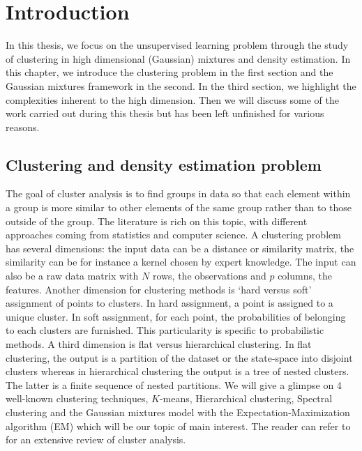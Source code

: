 
\chapter{Introduction\label{chap:intro}}
\minitoc
In this thesis, we focus on the unsupervised learning problem through the study of clustering in high dimensional (Gaussian) mixtures and density estimation. In this chapter, we introduce the clustering problem in the first section and the Gaussian mixtures framework in the second. In the third section, we highlight the complexities inherent to the high dimension. Then we will discuss some of the work carried out during this thesis but has been left unfinished for various reasons.
\section{Clustering and density estimation problem}
The goal of cluster analysis is to find groups in data so that each element within a group is more similar to other elements of the same group rather than to those outside of the group. The literature is rich on this topic, with different approaches coming from statistics and computer science. A clustering problem has several dimensions: the input data can be a distance or similarity matrix, the similarity can be for instance a kernel chosen by expert knowledge. The input can also be a raw data matrix with $N$ rows, the observations and $p$ columns, the features. Another dimension for clustering methods is `hard versus soft' assignment of points to clusters. In hard assignment, a point is assigned to  a unique cluster. In soft assignment, for each point, the probabilities of belonging to each clusters are furnished. This particularity is specific to probabilistic methods. A third dimension is flat versus hierarchical clustering. In flat clustering, the output is a partition of the dataset or the state-space into disjoint clusters whereas in hierarchical clustering the output is a tree of nested clusters. The latter is a finite sequence of nested partitions. We will give a glimpse on 4 well-known clustering techniques, $K$-means, Hierarchical clustering, Spectral clustering and the Gaussian mixtures model with the Expectation-Maximization algorithm (EM) which will be our topic of main interest. The reader can refer to \citep{hennig2015handbook} for an extensive review of cluster analysis.
